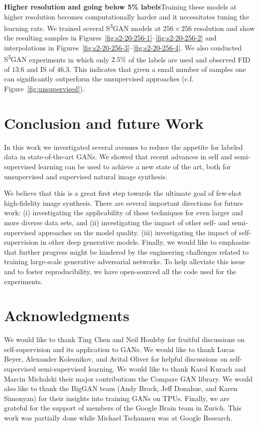 \documentclass{article}
\newcommand{\tranSSS}{\textsc{S\textsuperscript{3}GAN}}
\begin{document}
\textbf{Higher resolution and going below 5\% labels}\quad Training these models at higher resolution becomes computationally harder and it necessitates tuning the learning rate. We trained several \tranSSS{} models at $256 \times 256$ resolution and show the resulting samples in Figures~\ref{fig:s2-20-256-1}--\ref{fig:s2-20-256-2} and interpolations in Figures~\ref{fig:s2-20-256-3}--\ref{fig:s2-20-256-4}.
We also conducted \tranSSS{} experiments in which only $2.5\%$ of the labels are used and observed FID of $13.6$ and IS of $46.3$. This indicates that given a small number of samples one can significantly outperform the unsupervised approaches (c.f. Figure~\ref{fig:unsupervised}).


\section{Conclusion and future Work}
In this work we investigated several avenues to reduce the appetite for labeled data in state-of-the-art GANs. We showed that recent advances in self and semi-supervised learning can be used to achieve a new state of the art, both for unsupervised and supervised natural image synthesis.

We believe that this is a great first step towards the ultimate goal of few-shot high-fidelity image synthesis. There are several important directions for future work: (i) investigating the applicability of these techniques for even larger and more diverse data sets, and (ii) investigating the impact of other self- and semi-supervised approaches on the model quality. (iii) investigating the impact of self-supervision in other deep generative models. Finally, we would like to emphasize that further progress might be hindered by the engineering challenges related to training large-scale generative adversarial networks. To help alleviate this issue and to foster reproducibility, we have open-sourced all the code used for the experiments.

\section*{Acknowledgments}
We would like to thank Ting Chen and Neil Houlsby for fruitful discussions on self-supervision and its application to GANs. We would like to thank Lucas Beyer, Alexander Kolesnikov, and Avital Oliver for helpful discussions on self-supervised semi-supervised learning. We would like to thank Karol Kurach and Marcin Michalski their major contributions the Compare GAN library. We would also like to thank the BigGAN team (Andy Brock, Jeff Donahue, and Karen Simonyan) for their insights into training GANs on TPUs. Finally, we are grateful for the support of members of the Google Brain team in Zurich. This work was partially done while Michael Tschannen was at Google Research.


\end{document}
